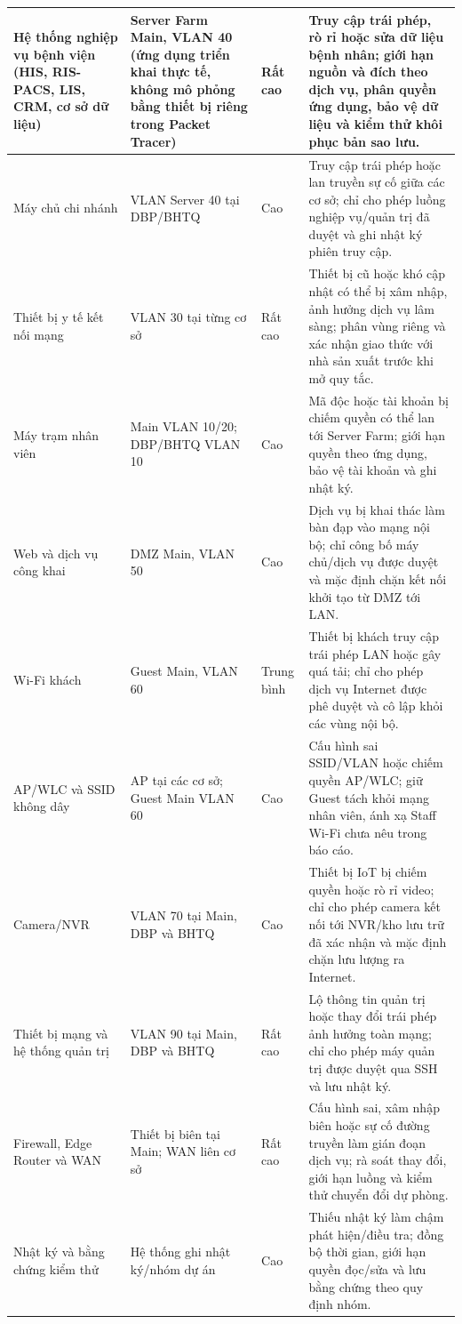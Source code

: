 \begin{small}
\begin{longtable}{|p{2.6cm}|p{3.3cm}|p{2.7cm}|p{5.8cm}|}
Hệ thống nghiệp vụ bệnh viện (HIS, RIS-PACS, LIS, CRM, cơ sở dữ liệu) & Server Farm Main, VLAN 40 (ứng dụng triển khai thực tế, không mô phỏng bằng thiết bị riêng trong Packet Tracer) & Rất cao & Truy cập trái phép, rò rỉ hoặc sửa dữ liệu bệnh nhân; giới hạn nguồn và đích theo dịch vụ, phân quyền ứng dụng, bảo vệ dữ liệu và kiểm thử khôi phục bản sao lưu. \\ \hline
Máy chủ chi nhánh & VLAN Server 40 tại DBP/BHTQ & Cao & Truy cập trái phép hoặc lan truyền sự cố giữa các cơ sở; chỉ cho phép luồng nghiệp vụ/quản trị đã duyệt và ghi nhật ký phiên truy cập. \\ \hline
Thiết bị y tế kết nối mạng & VLAN 30 tại từng cơ sở & Rất cao & Thiết bị cũ hoặc khó cập nhật có thể bị xâm nhập, ảnh hưởng dịch vụ lâm sàng; phân vùng riêng và xác nhận giao thức với nhà sản xuất trước khi mở quy tắc. \\ \hline
Máy trạm nhân viên & Main VLAN 10/20; DBP/BHTQ VLAN 10 & Cao & Mã độc hoặc tài khoản bị chiếm quyền có thể lan tới Server Farm; giới hạn quyền theo ứng dụng, bảo vệ tài khoản và ghi nhật ký. \\ \hline
Web và dịch vụ công khai & DMZ Main, VLAN 50 & Cao & Dịch vụ bị khai thác làm bàn đạp vào mạng nội bộ; chỉ công bố máy chủ/dịch vụ được duyệt và mặc định chặn kết nối khởi tạo từ DMZ tới LAN. \\ \hline
Wi-Fi khách & Guest Main, VLAN 60 & Trung bình & Thiết bị khách truy cập trái phép LAN hoặc gây quá tải; chỉ cho phép dịch vụ Internet được phê duyệt và cô lập khỏi các vùng nội bộ. \\ \hline
AP/WLC và SSID không dây & AP tại các cơ sở; Guest Main VLAN 60 & Cao & Cấu hình sai SSID/VLAN hoặc chiếm quyền AP/WLC; giữ Guest tách khỏi mạng nhân viên, ánh xạ Staff Wi-Fi chưa nêu trong báo cáo. \\ \hline
Camera/NVR & VLAN 70 tại Main, DBP và BHTQ & Cao & Thiết bị IoT bị chiếm quyền hoặc rò rỉ video; chỉ cho phép camera kết nối tới NVR/kho lưu trữ đã xác nhận và mặc định chặn lưu lượng ra Internet. \\ \hline
Thiết bị mạng và hệ thống quản trị & VLAN 90 tại Main, DBP và BHTQ & Rất cao & Lộ thông tin quản trị hoặc thay đổi trái phép ảnh hưởng toàn mạng; chỉ cho phép máy quản trị được duyệt qua SSH và lưu nhật ký. \\ \hline
Firewall, Edge Router và WAN & Thiết bị biên tại Main; WAN liên cơ sở & Rất cao & Cấu hình sai, xâm nhập biên hoặc sự cố đường truyền làm gián đoạn dịch vụ; rà soát thay đổi, giới hạn luồng và kiểm thử chuyển đổi dự phòng. \\ \hline
Nhật ký và bằng chứng kiểm thử & Hệ thống ghi nhật ký/nhóm dự án & Cao & Thiếu nhật ký làm chậm phát hiện/điều tra; đồng bộ thời gian, giới hạn quyền đọc/sửa và lưu bằng chứng theo quy định nhóm. \\ \hline
\end{longtable}
\end{small}

